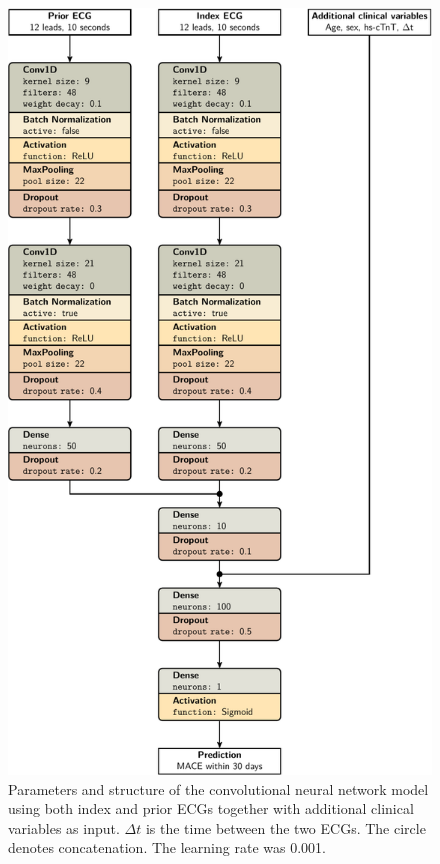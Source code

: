 \documentclass[preprint]{elsarticle}
\begin{document}
\begin{figure}[H]
\centering
\includegraphics[scale=\modelscale,keepaspectratio]{figures/model-cnn4.pdf}
\caption{Parameters and structure of the convolutional neural network model using both index and prior ECGs together with additional clinical variables as input. $\Delta t$ is the time between the two ECGs. The circle denotes concatenation. The learning rate was 0.001.}
\end{figure}
\end{document}
